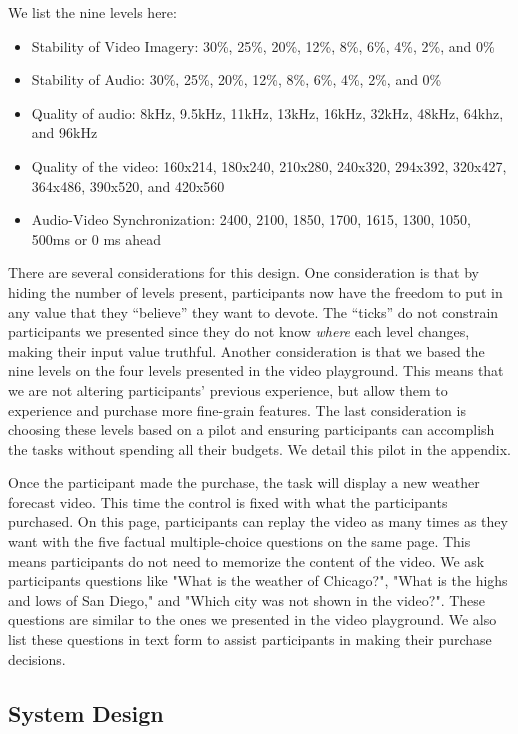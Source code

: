 We list the nine levels here:
\begin{itemize}
    \item Stability of Video Imagery: 30\%, 25\%, 20\%, 12\%, 8\%, 6\%, 4\%, 2\%, and 0\%
    
    \item Stability of Audio: 30\%, 25\%, 20\%, 12\%, 8\%, 6\%, 4\%, 2\%, and 0\%
    
    \item Quality of audio: 8kHz, 9.5kHz, 11kHz, 13kHz, 16kHz, 32kHz, 48kHz, 64khz, and 96kHz
    
    \item Quality of the video: 160x214, 180x240, 210x280, 240x320, 294x392, 320x427, 364x486, 390x520, and 420x560 
    
    \item Audio-Video Synchronization: 2400, 2100, 1850, 1700, 1615, 1300, 1050, 500ms or 0 ms ahead
\end{itemize}

There are several considerations for this design. One consideration is that by hiding the number of levels present, participants now have the freedom to put in any value that they ``believe'' they want to devote. The ``ticks'' do not constrain participants we presented since they do not know \textit{where} each level changes, making their input value truthful. Another consideration is that we based the nine levels on the four levels presented in the video playground. This means that we are not altering participants' previous experience, but allow them to experience and purchase more fine-grain features. The last consideration is choosing these levels based on a pilot and ensuring participants can accomplish the tasks without spending all their budgets. We detail this pilot in the appendix.

Once the participant made the purchase, the task will display a new weather forecast video. This time the control is fixed with what the participants purchased. On this page, participants can replay the video as many times as they want with the five factual multiple-choice questions on the same page. This means participants do not need to memorize the content of the video. We ask participants questions like "What is the weather of Chicago?", "What is the highs and lows of San Diego," and "Which city was not shown in the video?". These questions are similar to the ones we presented in the video playground. We also list these questions in text form to assist participants in making their purchase decisions. 

\subsection{System Design}
